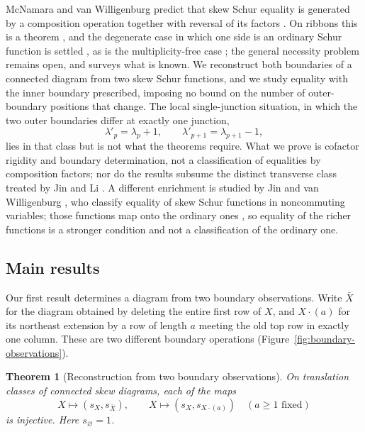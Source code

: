 \documentclass[11pt,a4paper]{amsart}
\numberwithin{equation}{section}
\theoremstyle{plain}
\newtheorem{theorem}{Theorem}[section]
\theoremstyle{definition}
\begin{document}
McNamara and van Willigenburg predict that skew Schur equality is generated by a composition operation together with reversal of its factors \cite{McNamara2009Classification}.  On ribbons this is a theorem \cite{Billera2006DecomposableCompositions}, and the degenerate case in which one side is an ordinary Schur function is settled \cite{VanWilligenburg2005Equality}, as is the multiplicity-free case \cite[Thm.~3.14]{Gutschwager2009MultiplicityFree}; the general necessity problem remains open, and \cite{McNamara2014ComparingSkew} surveys what is known.  We reconstruct both boundaries of a connected diagram from two skew Schur functions, and we study equality with the inner boundary prescribed, imposing no bound on the number of outer-boundary positions that change.  The local single-junction situation, in which the two outer boundaries differ at exactly one junction,
\[
\lambda'_p=\lambda_p+1,
\qquad
\lambda'_{p+1}=\lambda_{p+1}-1,
\]
lies in that class but is not what the theorems require.  What we prove is cofactor rigidity and boundary determination, not a classification of equalities by composition factors; nor do the results subsume the distinct transverse class treated by Jin and Li \cite{Jin2024ThickenedRibbon}.  A different enrichment is studied by Jin and van Willigenburg \cite[Thm.~3.1]{Jin2025NoncommutingEquality}, who classify equality of skew Schur functions in noncommuting variables; those functions map onto the ordinary ones \cite[Lem.~2.19]{Jin2025NoncommutingEquality}, so equality of the richer functions is a stronger condition and not a classification of the ordinary one.


\subsection{Main results}\label{subsec:intro-main}

Our first result determines a diagram from two boundary observations.
Write \(\bar X\) for the diagram obtained by deleting the entire first row
of \(X\), and \(X\cdot(a)\) for its northeast extension by a row of length
\(a\) meeting the old top row in exactly one column.  These are two
different boundary operations (Figure~\ref{fig:boundary-observations}).

\begin{theorem}[Reconstruction from two boundary observations]\label{thm:boundary-reconstruction}
On translation classes of connected skew diagrams, each of the maps
\[
X\longmapsto(s_X,s_{\bar X}),
\qquad
X\longmapsto(s_X,s_{X\cdot(a)})
\quad(a\ge1\text{ fixed})
\]
is injective.  Here \(s_\varnothing=1\).
\end{theorem}
\end{document}
